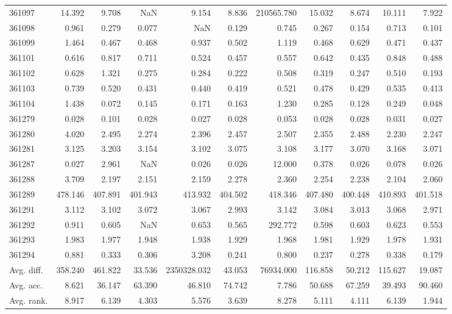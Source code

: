 \begin{tabular}{lrrrrrrrrrr}
361097 & 14.392 & 9.708 & NaN & 9.154 & 8.836 & 210565.780 & 15.032 & 8.674 & 10.111 & 7.922 \\
361098 & 0.961 & 0.279 & 0.077 & NaN & 0.129 & 0.745 & 0.267 & 0.154 & 0.713 & 0.101 \\
361099 & 1.464 & 0.467 & 0.468 & 0.937 & 0.502 & 1.119 & 0.468 & 0.629 & 0.471 & 0.437 \\
361101 & 0.616 & 0.817 & 0.711 & 0.524 & 0.457 & 0.557 & 0.642 & 0.435 & 0.848 & 0.488 \\
361102 & 0.628 & 1.321 & 0.275 & 0.284 & 0.222 & 0.508 & 0.319 & 0.247 & 0.510 & 0.193 \\
361103 & 0.739 & 0.520 & 0.431 & 0.440 & 0.419 & 0.521 & 0.478 & 0.429 & 0.535 & 0.413 \\
361104 & 1.438 & 0.072 & 0.145 & 0.171 & 0.163 & 1.230 & 0.285 & 0.128 & 0.249 & 0.048 \\
361279 & 0.028 & 0.101 & 0.028 & 0.027 & 0.028 & 0.053 & 0.028 & 0.028 & 0.031 & 0.027 \\
361280 & 4.020 & 2.495 & 2.274 & 2.396 & 2.457 & 2.507 & 2.355 & 2.488 & 2.230 & 2.247 \\
361281 & 3.125 & 3.203 & 3.154 & 3.102 & 3.075 & 3.108 & 3.177 & 3.070 & 3.168 & 3.071 \\
361287 & 0.027 & 2.961 & NaN & 0.026 & 0.026 & 12.000 & 0.378 & 0.026 & 0.078 & 0.026 \\
361288 & 3.709 & 2.197 & 2.151 & 2.159 & 2.278 & 2.360 & 2.254 & 2.238 & 2.104 & 2.060 \\
361289 & 478.146 & 407.891 & 401.943 & 413.932 & 404.502 & 418.346 & 407.480 & 400.448 & 410.893 & 401.518 \\
361291 & 3.112 & 3.102 & 3.072 & 3.067 & 2.993 & 3.142 & 3.084 & 3.013 & 3.068 & 2.971 \\
361292 & 0.911 & 0.605 & NaN & 0.653 & 0.565 & 292.772 & 0.598 & 0.603 & 0.623 & 0.553 \\
361293 & 1.983 & 1.977 & 1.948 & 1.938 & 1.929 & 1.968 & 1.981 & 1.929 & 1.978 & 1.931 \\
361294 & 0.881 & 0.333 & 0.306 & 3.208 & 0.241 & 0.800 & 0.237 & 0.278 & 0.338 & 0.179 \\
Avg. diff. & 358.240 & 461.822 & 33.536 & 2350328.032 & 43.053 & 76934.000 & 116.858 & 50.212 & 115.627 & 19.087 \\
Avg. acc. & 8.621 & 36.147 & 63.390 & 46.810 & 74.742 & 7.786 & 50.688 & 67.259 & 39.493 & 90.460 \\
Avg. rank. & 8.917 & 6.139 & 4.303 & 5.576 & 3.639 & 8.278 & 5.111 & 4.111 & 6.139 & 1.944 \\
\bottomrule
\end{tabular}
